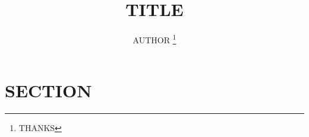 \documentclass[dvipdfmx,titlepage]{jsarticle}
\title{TITLE}
\author{AUTHOR \thanks{THANKS}}
\begin{document}
\maketitle


\section{SECTION}

\end{document}

